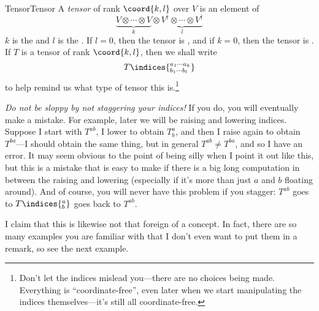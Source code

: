 \begin{dfn}{Tensor}{Tensor}
A \emph{tensor} of rank $\coord{k,l}$ over $V$ is an element of
\begin{equation}
\underbrace{V\otimes \cdots \otimes V}_k\otimes \underbrace{V^{\dagger}\otimes \cdots \otimes V^{\dagger}}_l
\end{equation}
$k$ is the  and $l$ is the .  If $l=0$, then the tensor is , and if $k=0$, then the tensor is .  If $T$ is a tensor of rank $\coord{k,l}$, then we shall write
\begin{equation}
T\indices{^{a_1\cdots a_k}_{b_1\cdots b_l}}
\end{equation}
to help remind us what type of tensor this is.\footnote{Don't let the indices mislead you---there are no choices being made.  Everything is ``coordinate-free'', even later when we start manipulating the indices themselves---it's still all coordinate-free.}
\begin{rmk}
\emph{Do not be sloppy by not staggering your indices!}  If you do, you will eventually make a mistake.  For example, later we will be raising and lowering indices.  Suppose I start with $T^{ab}$, I lower to obtain $T_b^a$, and then I raise again to obtain $T^{ba}$---I should obtain the same thing, but in general $T^{ab}\neq T^{ba}$, and so I have an error.  It may seem obvious to the point of being silly when I point it out like this, but this is a mistake that is easy to make if there is a big long computation in between the raising and lowering (especially if it's more than just $a$ and $b$ floating around).  And of course, you will never have this problem if you stagger:  $T^{ab}$ goes to $T\indices{^a_b}$ goes back to $T^{ab}$.
\end{rmk}
\begin{rmk}
I claim that this is likewise not that foreign of a concept.  In fact, there are so many examples you are familiar with that I don't even want to put them in a remark, so see the next example.
\end{rmk}
\end{dfn}
